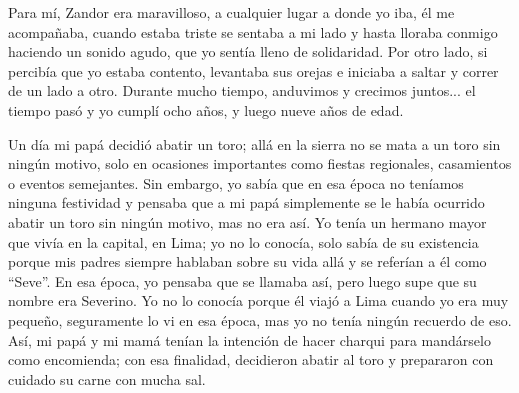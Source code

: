 Para mí, Zandor era maravilloso, a cualquier lugar a donde yo iba, él me acompañaba, cuando estaba triste se sentaba a mi lado y hasta lloraba conmigo haciendo un sonido agudo, que yo sentía lleno de solidaridad.
Por otro lado, si percibía que yo estaba contento, levantaba sus orejas e iniciaba a saltar y correr de un lado a otro. 
Durante mucho tiempo, anduvimos y crecimos juntos... el tiempo pasó y yo cumplí ocho años, y luego nueve años de edad.

Un día mi papá decidió abatir un toro; allá en la sierra no se mata a un toro sin ningún motivo, solo en ocasiones importantes como fiestas regionales, casamientos o eventos semejantes. 
Sin embargo, yo sabía que en esa época no teníamos ninguna festividad y pensaba que a mi papá simplemente se le había ocurrido abatir un toro sin ningún motivo, mas no era así.
Yo tenía un hermano mayor que vivía en la capital, en Lima; yo no lo conocía, solo sabía de su existencia porque mis padres siempre hablaban sobre su vida allá y se referían a él como ``Seve''. 
En esa época, yo pensaba que se llamaba así, pero luego supe que su nombre era Severino. 
Yo no lo conocía porque él viajó a Lima cuando yo era muy pequeño, seguramente lo vi en esa época, mas yo no tenía ningún recuerdo de eso.
Así, mi papá y mi mamá tenían la intención de hacer charqui para mandárselo como encomienda; 
con esa finalidad, decidieron abatir al toro y prepararon con cuidado su carne con mucha sal.

